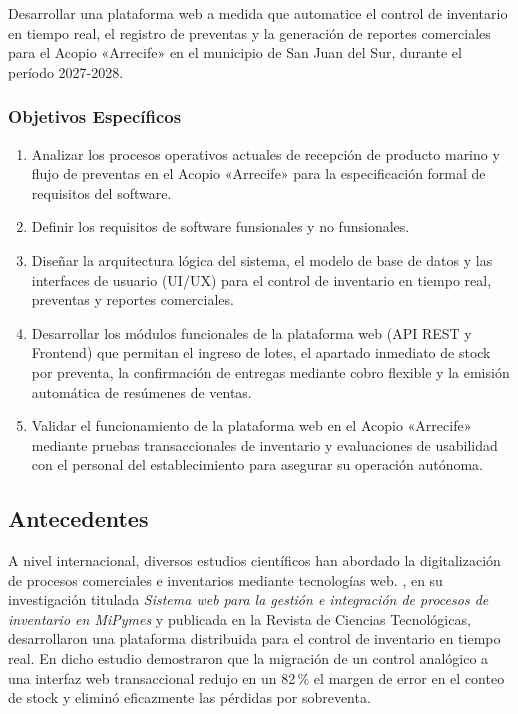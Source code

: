 Desarrollar una plataforma web a medida que automatice el control de inventario en tiempo real, el registro de preventas y la generación de reportes comerciales para el Acopio «Arrecife» en el municipio de San Juan del Sur, durante el período 2027-2028.

\subsubsection{Objetivos Específicos}

\begin{enumerate}
  \item Analizar los procesos operativos actuales de recepción de producto marino y flujo de preventas en el Acopio «Arrecife» para la especificación formal de requisitos del software.
  \item Definir los requisitos de software funsionales y no funsionales.
  \item Diseñar la arquitectura lógica del sistema, el modelo de base de datos y las interfaces de usuario (UI/UX) para el control de inventario en tiempo real, preventas y reportes comerciales.
  \item Desarrollar los módulos funcionales de la plataforma web (API REST y Frontend) que permitan el ingreso de lotes, el apartado inmediato de stock por preventa, la confirmación de entregas mediante cobro flexible y la emisión automática de resúmenes de ventas.
  \item Validar el funcionamiento de la plataforma web en el Acopio «Arrecife» mediante pruebas transaccionales de inventario y evaluaciones de usabilidad con el personal del establecimiento para asegurar su operación autónoma.
\end{enumerate}

\subsection{Antecedentes}

A nivel internacional, diversos estudios científicos han abordado la digitalización de procesos comerciales e inventarios mediante tecnologías web. \textcite{villasmil2021}, en su investigación titulada \emph{Sistema web para la gestión e integración de procesos de inventario en MiPymes} y publicada en la Revista de Ciencias Tecnológicas, desarrollaron una plataforma distribuida para el control de inventario en tiempo real. En dicho estudio demostraron que la migración de un control analógico a una interfaz web transaccional redujo en un 82\,\% el margen de error en el conteo de stock y eliminó eficazmente las pérdidas por sobreventa.

